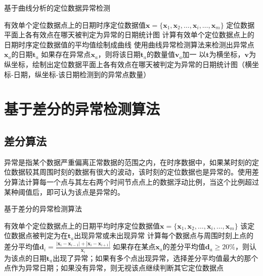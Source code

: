 \documentclass[a4paper,AutoFakeBold,oneside,12pt]{book}
\begin{document}
\begin{algorithm} 
\caption{基于曲线分析的定位数据异常检测} 
\label{a41}
\renewcommand{\algorithmicrequire}{\textbf{输入：}}
\renewcommand{\algorithmicensure}{\textbf{输出：}} 
\begin{algorithmic}[1] 
\Require 有效单个定位数据点上的日期时序定位数据值$\bm{x}=\{\bm{x}_1,\bm{x}_2,\ldots,\bm{x}_i,\ldots,\bm{x}_m\}$
\Ensure 定位数据平面上各有效点在哪天被判定为异常的日期统计图
\State 计算有效单个定位数据点上的日期时序定位数据值的平均值绘制成曲线
\State  使用曲线异常检测算法来检测出异常点$\bm{x}_a$的日期$\bm{t}_a$
\State 如果存在异常点$\bm{x}_a$，则将该日期$\bm{t}_a$的数量值$\bm{v}_a$加一
\State 以$\bm{t}$为横坐标，$\bm{v}$为纵坐标，绘制出定位数据平面上各有效点在哪天被判定为异常的日期统计图（横坐标-日期，纵坐标-该日期检测到的异常点数量）
\end{algorithmic}  
\end{algorithm}

\section{基于差分的异常检测算法}
\subsection{差分算法}
	异常是指某个数据严重偏离正常数据的范围之内，在时序数据中，如果某时刻的定位数据较其周围时刻的数据有很大的波动，该时刻的定位数据也是异常的。使用差分算法计算每一个点与其左右两个时间节点点上的数据浮动比例，当这个比例超过某种阈值后，即可认为该点是异常的。

\begin{algorithm} 
\caption{基于差分的异常检测算法} 
\label{a42}
\renewcommand{\algorithmicrequire}{\textbf{输入：}}
\renewcommand{\algorithmicensure}{\textbf{输出：}} 
\begin{algorithmic}[1] 
\Require 有效单个定位数据点上的日期平均时序定位数据值$\bm{x}=\{\bm{x}_1,\bm{x}_2,\ldots,\bm{x}_i,\ldots,\bm{x}_m\}$
\Ensure 该定位数据点被判定为在$\bm{t}_a$出现异常或未出现异常
\State  计算每个数据点与周围时刻上点的差分平均值$\bm{d}_i=\frac{|\bm{x}_i-\bm{x}_{i-1}|+|\bm{x}_i-\bm{x}_{i+1}|}{\bm{x}_i}$
\State 如果存在某点$\bm{x}_a$的差分平均值$\bm{d}_a\ge20\%$，则认为该点的日期$\bm{t}_a$出现了异常；如果有多个点出现异常，选择差分平均值最大的那个点作为异常日期；如果没有异常，则无视该点继续判断其它定位数据点
\end{algorithmic}  
\end{algorithm}
\end{document}
